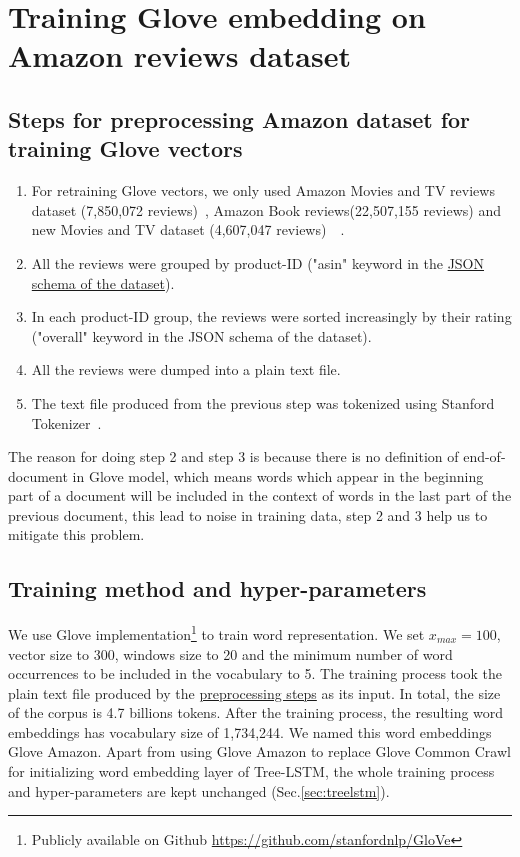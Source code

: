 \hypertarget{sec:Glove-Amazon}{\section{Training Glove embedding on Amazon reviews dataset}}
\label{sec:gloveamazone}
\subsection{Steps for preprocessing Amazon dataset for training Glove vectors}
\label{sec:preprocessamazonglove}
\begin{enumerate}
\item For retraining Glove vectors, we only used Amazon Movies and TV reviews dataset (7,850,072 reviews)~\cite{mcauley2013hidden}, Amazon Book reviews(22,507,155 reviews) and new Movies and TV dataset (4,607,047 reviews)~\cite{McAuleyTSH15}~\cite{HeM16}.
\item All the reviews were grouped by product-ID ("asin" keyword in the \hyperref[sec:amazon]{JSON schema of the dataset}).
\item In each product-ID group, the reviews were sorted increasingly by their rating ("overall" keyword in the JSON schema of the dataset).
\item All the reviews were dumped into a plain text file.
\item The text file produced from the previous step was tokenized using Stanford Tokenizer~\cite{tokenizerpart}.
\end{enumerate}
The reason for doing step 2 and step 3 is because there is no definition of end-of-document in Glove model, which means words which appear in the beginning part of a document will be included in the context of words in the last part of the previous document, this lead to noise in training data, step 2 and 3 help us to mitigate this problem.

\subsection{Training method and hyper-parameters}
We use Glove implementation\footnote{Publicly available on Github \url{https://github.com/stanfordnlp/GloVe}} to train word representation.
We set $x_{max} = 100$, vector size to 300, windows size to 20 and the minimum number of word occurrences to be included in the vocabulary to  5.
The training process took the plain text file produced by the \hyperref[sec:preprocessamazonglove]{preprocessing steps} as its input.
In total, the size of the corpus is 4.7 billions tokens.
After the training process, the resulting word embeddings has vocabulary size of 1,734,244.
We named this word embeddings Glove Amazon.
Apart from using Glove Amazon to replace Glove Common Crawl for initializing word embedding layer of Tree-LSTM, the whole training process and hyper-parameters are kept unchanged (Sec.\ref{sec:treelstm}).

